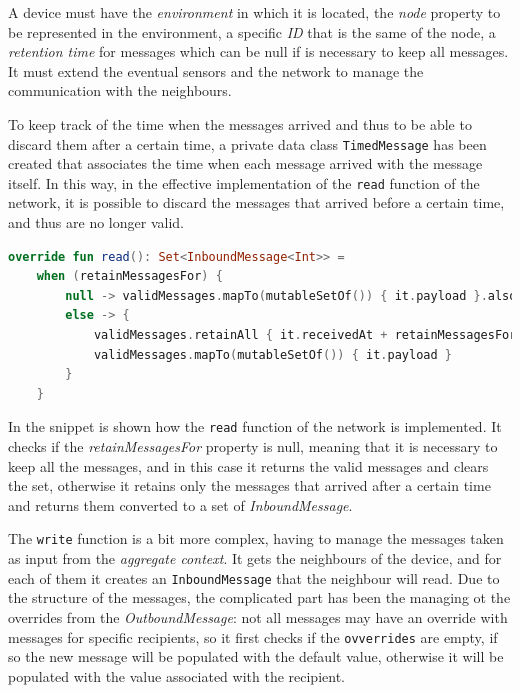A device must have the \emph{environment} in which it is located, the \emph{node} property to be represented in the environment,
a specific \emph{ID} that is the same of the node, a \emph{retention time} for messages which can be null if is necessary
to keep all messages.
It must extend the eventual sensors and the network to manage the communication with the neighbours.

To keep track of the time when the messages arrived and thus to be able to discard them after a certain time,
a private data class \texttt{TimedMessage} has been created that associates the time when each message arrived with the message itself.
In this way, in the effective implementation of the \texttt{read} function of the network, it is possible
to discard the messages that arrived before a certain time, and thus are no longer valid.

\begin{lstlisting}[language=kt,label={lst:read},caption={The implementation of the \texttt{read} function of the \texttt{Network}.}]
override fun read(): Set<InboundMessage<Int>> =
    when (retainMessagesFor) {
        null -> validMessages.mapTo(mutableSetOf()) { it.payload }.also { validMessages.clear() }
        else -> {
            validMessages.retainAll { it.receivedAt + retainMessagesFor >= currentTime }
            validMessages.mapTo(mutableSetOf()) { it.payload }
        }
    }
\end{lstlisting}

In the  snippet is shown how the \texttt{read} function of the network is implemented.
It checks if the \emph{retainMessagesFor} property is null, meaning that it is necessary to keep all the messages,
and in this case it returns the valid messages and clears the set, otherwise it retains only the messages that arrived
after a certain time and returns them converted to a set of \emph{InboundMessage}.

The \texttt{write} function is a bit more complex, having to manage the messages taken as input from the \emph{aggregate context}.
It gets the neighbours of the device, and for each of them it creates an \texttt{InboundMessage} that the neighbour will read.
Due to the structure of the messages, the complicated part has been the managing ot the overrides from the \emph{OutboundMessage}:
not all messages may have an override with messages for specific recipients, so it first checks if the \texttt{ovverrides} are empty,
if so the new message will be populated with the default value, otherwise it will be populated with the value associated with the recipient.

